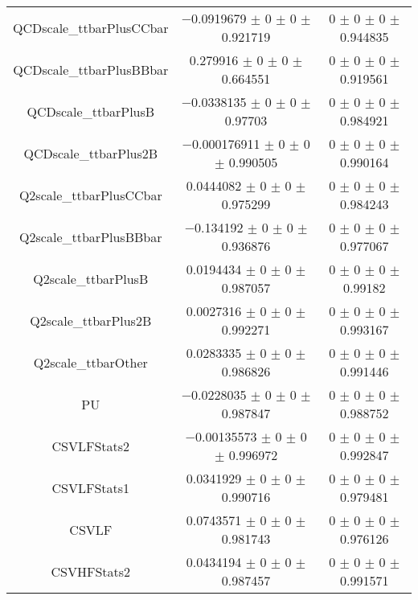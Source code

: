 \begin{table}
\begin{tabular}{ccc}
QCDscale\_ttbarPlusCCbar 	& \num{-0.0919679} $\pm$ \num{0} $\pm$ \num{0} $\pm$ \num{0.921719} 	& \num{0} $\pm$ \num{0} $\pm$ \num{0} $\pm$ \num{0.944835}\\
QCDscale\_ttbarPlusBBbar 	& \num{0.279916} $\pm$ \num{0} $\pm$ \num{0} $\pm$ \num{0.664551} 	& \num{0} $\pm$ \num{0} $\pm$ \num{0} $\pm$ \num{0.919561}\\
QCDscale\_ttbarPlusB 	& \num{-0.0338135} $\pm$ \num{0} $\pm$ \num{0} $\pm$ \num{0.97703} 	& \num{0} $\pm$ \num{0} $\pm$ \num{0} $\pm$ \num{0.984921}\\
QCDscale\_ttbarPlus2B 	& \num{-0.000176911} $\pm$ \num{0} $\pm$ \num{0} $\pm$ \num{0.990505} 	& \num{0} $\pm$ \num{0} $\pm$ \num{0} $\pm$ \num{0.990164}\\
Q2scale\_ttbarPlusCCbar 	& \num{0.0444082} $\pm$ \num{0} $\pm$ \num{0} $\pm$ \num{0.975299} 	& \num{0} $\pm$ \num{0} $\pm$ \num{0} $\pm$ \num{0.984243}\\
Q2scale\_ttbarPlusBBbar 	& \num{-0.134192} $\pm$ \num{0} $\pm$ \num{0} $\pm$ \num{0.936876} 	& \num{0} $\pm$ \num{0} $\pm$ \num{0} $\pm$ \num{0.977067}\\
Q2scale\_ttbarPlusB 	& \num{0.0194434} $\pm$ \num{0} $\pm$ \num{0} $\pm$ \num{0.987057} 	& \num{0} $\pm$ \num{0} $\pm$ \num{0} $\pm$ \num{0.99182}\\
Q2scale\_ttbarPlus2B 	& \num{0.0027316} $\pm$ \num{0} $\pm$ \num{0} $\pm$ \num{0.992271} 	& \num{0} $\pm$ \num{0} $\pm$ \num{0} $\pm$ \num{0.993167}\\
Q2scale\_ttbarOther 	& \num{0.0283335} $\pm$ \num{0} $\pm$ \num{0} $\pm$ \num{0.986826} 	& \num{0} $\pm$ \num{0} $\pm$ \num{0} $\pm$ \num{0.991446}\\
PU 	& \num{-0.0228035} $\pm$ \num{0} $\pm$ \num{0} $\pm$ \num{0.987847} 	& \num{0} $\pm$ \num{0} $\pm$ \num{0} $\pm$ \num{0.988752}\\
CSVLFStats2 	& \num{-0.00135573} $\pm$ \num{0} $\pm$ \num{0} $\pm$ \num{0.996972} 	& \num{0} $\pm$ \num{0} $\pm$ \num{0} $\pm$ \num{0.992847}\\
CSVLFStats1 	& \num{0.0341929} $\pm$ \num{0} $\pm$ \num{0} $\pm$ \num{0.990716} 	& \num{0} $\pm$ \num{0} $\pm$ \num{0} $\pm$ \num{0.979481}\\
CSVLF 	& \num{0.0743571} $\pm$ \num{0} $\pm$ \num{0} $\pm$ \num{0.981743} 	& \num{0} $\pm$ \num{0} $\pm$ \num{0} $\pm$ \num{0.976126}\\
CSVHFStats2 	& \num{0.0434194} $\pm$ \num{0} $\pm$ \num{0} $\pm$ \num{0.987457} 	& \num{0} $\pm$ \num{0} $\pm$ \num{0} $\pm$ \num{0.991571}\\

\end{tabular}
\end{table}
